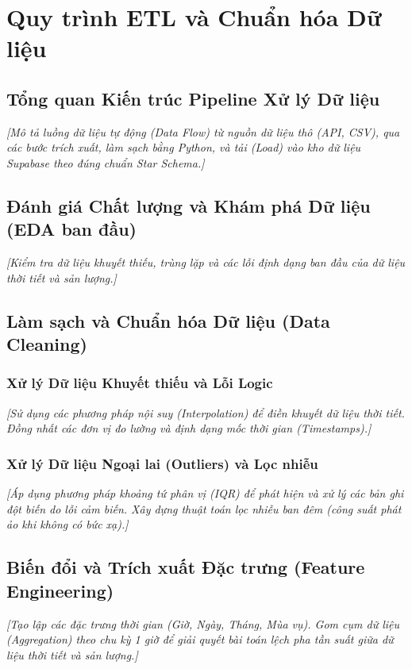\documentclass[12pt, a4paper]{report}
\begin{document}
\chapter{Quy trình ETL và Chuẩn hóa Dữ liệu}
\label{chap:etl_cleaning}

\section{Tổng quan Kiến trúc Pipeline Xử lý Dữ liệu}
\label{sec:pipeline_overview}
\textit{[Mô tả luồng dữ liệu tự động (Data Flow) từ nguồn dữ liệu thô (API, CSV), qua các bước trích xuất, làm sạch bằng Python, và tải (Load) vào kho dữ liệu Supabase theo đúng chuẩn Star Schema.]}

\section{Đánh giá Chất lượng và Khám phá Dữ liệu (EDA ban đầu)}
\label{sec:data_quality}
\textit{[Kiểm tra dữ liệu khuyết thiếu, trùng lặp và các lỗi định dạng ban đầu của dữ liệu thời tiết và sản lượng.]}

\section{Làm sạch và Chuẩn hóa Dữ liệu (Data Cleaning)}
\label{sec:cleaning}
\subsection{Xử lý Dữ liệu Khuyết thiếu và Lỗi Logic}
\textit{[Sử dụng các phương pháp nội suy (Interpolation) để điền khuyết dữ liệu thời tiết. Đồng nhất các đơn vị đo lường và định dạng mốc thời gian (Timestamps).]}

\subsection{Xử lý Dữ liệu Ngoại lai (Outliers) và Lọc nhiễu}
\textit{[Áp dụng phương pháp khoảng tứ phân vị (IQR) để phát hiện và xử lý các bản ghi đột biến do lỗi cảm biến. Xây dựng thuật toán lọc nhiễu ban đêm (công suất phát ảo khi không có bức xạ).]}

\section{Biến đổi và Trích xuất Đặc trưng (Feature Engineering)}
\label{sec:transformation}
\textit{[Tạo lập các đặc trưng thời gian (Giờ, Ngày, Tháng, Mùa vụ). Gom cụm dữ liệu (Aggregation) theo chu kỳ 1 giờ để giải quyết bài toán lệch pha tần suất giữa dữ liệu thời tiết và sản lượng.]}
\end{document}
